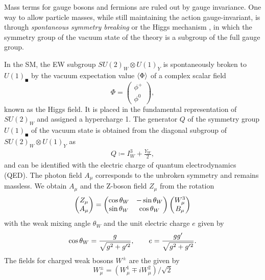 Mass terms for gauge bosons and fermions are ruled out by gauge invariance.
One way to allow particle masses, while still maintaining the action gauge-invariant, is through 
\emph{spontaneous symmetry breaking} or the Higgs mechanism \cite{Higgs1964b,Higgs1964,Englert1964,Higgs1966}, in which
the symmetry group of the vacuum state of the theory is a subgroup of the full gauge group. 

In the SM, the EW subgroup  $SU(2)_W \otimes U(1)_Y$ is spontaneously broken
to $U(1)_\QED$ by the vacuum expectation value $\expval{\Phi}$ of a complex scalar field
\[
\Phi = \begin{pmatrix}
  \phi^+ \\ \phi^0
\end{pmatrix},
\]
known as the Higgs field. It is placed in the fundamental representation of $SU(2)_W$ and assigned a hypercharge 1.
The generator $Q$ of the symmetry group $U(1)_\QED$ of the vacuum state is obtained from the diagonal subgroup 
of $SU(2)_W \otimes U(1)_Y$ as
\begin{align}\label{eq:GMN}
  Q\coloneqq I^3_W+\frac{Y_W}{2},
\end{align}
and can be identified with the electric charge of quantum electrodynamics (QED). 
The photon field $A_\mu$ corresponds to the unbroken symmetry and remains massless.
We obtain $A_\mu$ and the Z-boson field $Z_\mu$ from the rotation
\begin{equation}
  \begin{pmatrix}
    Z_\mu \\ A_\mu
  \end{pmatrix} = \begin{pmatrix}
    \cos \theta_W & -\sin \theta_W \\ \sin \theta_W & \cos \theta_W
  \end{pmatrix}
  \begin{pmatrix}
    W^3_\mu \\ B_\mu
  \end{pmatrix}
\end{equation}
with the weak mixing angle $\theta_W$ and the unit electric charge $e$ given by
\begin{equation}
  \cos \theta_W =  \frac{g}{\sqrt{g^2+g^{\prime 2}}},
  \qquad
  e = \frac{gg'}{\sqrt{g^2+g^{\prime 2}}}.
\end{equation}
The fields for charged weak bosons $W^{\pm}$ are the given by
\begin{equation}
  W^\pm_\mu = (W^1_\mu\mp i W^2_\mu)/\sqrt{2}
\end{equation}


